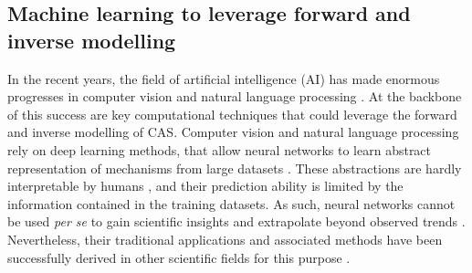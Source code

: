 \subsection{Machine learning to leverage forward and inverse modelling}

In the recent years, the field of artificial intelligence (AI) has made enormous progresses in computer vision \citep{XXX} and natural language processing \citep{XXX}. At the backbone of this success are key computational techniques that could leverage the forward and inverse modelling of CAS.
% 
% 
% 
% 
% 
Computer vision and natural language processing rely on deep learning methods, that allow neural networks to learn abstract representation of mechanisms from large datasets \citep{LeCun2015}.
% 
These abstractions are hardly interpretable by humans \citep{XXX}, and their prediction ability is limited by the information contained in the training datasets. As such, neural networks cannot be used \textit{per se} to gain scientific insights and extrapolate beyond observed trends \citep{Barnosky2012,Urban2016}. %
% 
Nevertheless, their traditional applications and associated methods have been successfully derived in other scientific fields for this purpose \citep{Kashinath2021,Schneider2017,Yazdani2020,Rolnick2023}.

